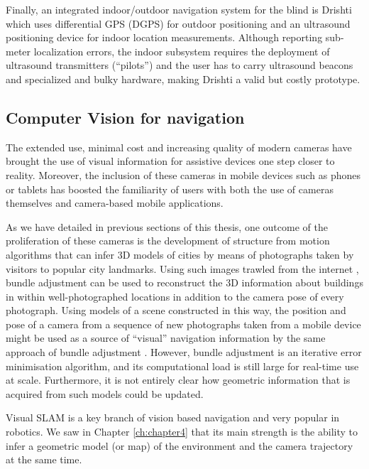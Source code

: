 Finally, an integrated indoor/outdoor navigation system for the blind is Drishti \citep{ran2004drishti} which uses differential GPS (DGPS) for outdoor positioning and an ultrasound positioning device for indoor location measurements. Although reporting sub-meter localization errors, the indoor subsystem requires the deployment of ultrasound transmitters (``pilots'') and the user has to carry ultrasound beacons and specialized and bulky hardware, making Drishti a valid but costly prototype.

\subsection{Computer Vision for navigation}

The extended use, minimal cost and increasing quality of modern cameras have brought the use of visual information for assistive devices one step closer to reality. Moreover, the inclusion of these cameras in mobile devices such as phones or tablets has boosted the familiarity of users with both the use of cameras themselves and camera-based mobile applications.

As we have detailed in previous sections of this thesis, one outcome of the proliferation of these cameras is the development of structure from motion algorithms that can infer 3D models of cities \citep{agarwal2011building} by means of photographs taken by visitors to popular city landmarks. Using such images trawled from the internet \citep{snavely2006photo}, bundle adjustment can be used to reconstruct the 3D information about buildings in within well-photographed locations in addition to the camera pose of every photograph. Using models of a scene constructed in this way, the position and pose of a camera from a sequence of new photographs taken from a mobile device might be used as a source of ``visual'' navigation information by the same approach of bundle adjustment \citep{ventura2014global}.  However, bundle adjustment is an iterative error minimisation algorithm, and its computational load is still large for real-time use at scale.  Furthermore, it is not entirely clear how geometric information that is acquired from such models could be updated.

Visual SLAM is a key branch of vision based navigation and very popular in robotics. We saw in Chapter \ref{ch:chapter4} that its main strength is the ability to infer a geometric model (or map) of the environment and the camera trajectory at the same time. 

